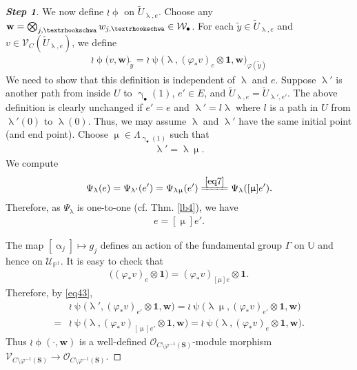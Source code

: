 \documentclass[12pt,a4paper,notitlepage]{article}
\theoremstyle{definition}
\theoremstyle{plain}
\newcommand{\mc}{\mathcal}
\newcommand{\wtd}{\widetilde}
\newcommand{\id}{\mathbf{1}}
\newcommand{\scr}{\mathscr}
\newcommand{\blt}{\bullet}
\newcommand{\Ubb}{\mathbb U}
\newcommand{\Pbb}{\mathbb P}
\newcommand{\Sbf}{\mathbf{S}}
\newcommand{\wbf}{\mathbf w}
\newcommand{\tipae}{\text{\textrhookschwa}}
\numberwithin{equation}{subsection}
\begin{document}
\begin{proof}[\textbf{Step 1}]
We now define $\wr\upphi$ on $\wtd U_{\uplambda,e}$. Choose any $\wbf=\bigotimes_{j,\tipae}w_{j,\tipae}\in \mc W_\blt$. For each $\wtd y\in\wtd U_{\uplambda,e}$ and $v\in\scr V_C(\wtd U_{\uplambda,e})$, we define
\begin{align}
\boxed{~\wr\upphi\big(v,\wbf\big)_{\wtd y}=\wr\uppsi\big(\uplambda,(\varphi_*v)_e\otimes\id,\wbf\big)_{\varphi(\wtd y)}~}\label{eq50}	
\end{align}
We need to show that this definition is independent of $\uplambda$ and $e$. Suppose $\uplambda'$ is another path from inside $U$ to $\upgamma_\blt(1)$, $e'\in E$, and $\wtd U_{\uplambda,e}=\wtd U_{\uplambda',e'}$. The above definition is clearly unchanged if $e'=e$ and $\uplambda'=l\uplambda$ where $l$ is a path in $U$ from $\uplambda'(0)$ to $\uplambda(0)$. Thus, we may assume $\uplambda$ and $\uplambda'$ have the same initial point (and end point). Choose $\upmu\in\Lambda_{\upgamma_\blt(1)}$ such that
\begin{align*}
\uplambda'=\uplambda\upmu.	
\end{align*}
We compute
\begin{align*}
\Psi_{\uplambda}(e)=\Psi_{\uplambda'}(e')=\Psi_{\uplambda\upmu}(e')\xlongequal{\eqref{eq7}}\Psi_{\uplambda}([\upmu]e').	
\end{align*}
Therefore, as $\Psi_{\uplambda}$ is one-to-one (cf. Thm. \ref{lb4}), we have
\begin{align*}
e=[\upmu]e'.	
\end{align*}

The map $[\upalpha_j]\mapsto g_j$ defines an action of the fundamental group $\Gamma$ on $\Ubb$ and hence on $\scr U_{\Pbb^1}$. It is easy to check that
\begin{align*}
[\upmu]	\big((\varphi_*v)_e\otimes\id\big)=(\varphi_*v)_{[\mu]e}\otimes\id.
\end{align*}
Therefore, by \eqref{eq43},
\begin{align*}
&\wr\uppsi\big(\uplambda',(\varphi_*v)_{e'}\otimes\id,\wbf\big)=\wr\uppsi\big(\uplambda\upmu,(\varphi_*v)_{e'}\otimes\id,\wbf\big)\\
=&	\wr\uppsi\big(\uplambda,(\varphi_*v)_{[\upmu]e'}\otimes\id,\wbf\big)=\wr\uppsi\big(\uplambda,(\varphi_*v)_e\otimes\id,\wbf\big).
\end{align*}
Thus $\wr\upphi(\cdot,\wbf)$ is a well-defined $\scr O_{C\setminus\varphi^{-1}(\Sbf)}$-module morphism $\scr V_{C\setminus\varphi^{-1}(\Sbf)}\rightarrow \scr O_{C\setminus\varphi^{-1}(\Sbf)}$.
\end{proof}
\end{document}
